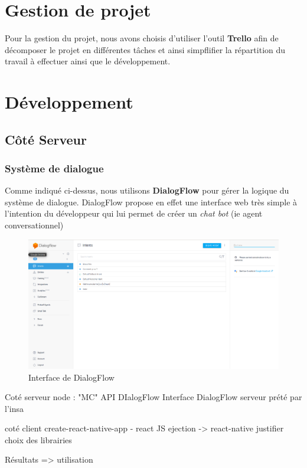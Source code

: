 \section{Gestion de projet}

Pour la gestion du projet, nous avons choisis d'utiliser l'outil \textbf{Trello}\cite{trello} afin de décomposer le projet en différentes tâches et ainsi simpflifier 
la répartition du travail à effectuer ainsi que le développement. 

\section{Développement}

\subsection{Côté Serveur}

\subsubsection{Système de dialogue}

Comme indiqué ci-dessus, nous utilisons \textbf{DialogFlow} pour gérer la logique du système de dialogue. DialogFlow propose en effet une interface web très simple à 
l'intention du développeur qui lui permet de créer un \emph{chat bot} (ie agent conversationnel) 

\begin{figure}[H]
    \centering
        \centering
        \includegraphics[width=1\textwidth]{images/dialogflow.png}
        \caption{Interface de DialogFlow}
\end{figure}

Coté serveur 
    node : "MC"
    API DIalogFlow
    Interface DialogFlow 
    serveur prété par l'insa 

coté client 
    create-react-native-app - react JS 
    ejection -> react-native 
    justifier choix des librairies 

Résultats => utilisation 
    